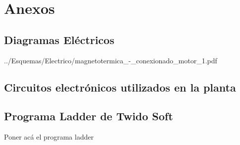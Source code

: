 \chapter{Anexos}
\label{ch:anexos}


\cleardoublepage
\section{Diagramas Eléctricos}
\label{anexo:diag}

{../Esquemas/Electrico/magnetotermica_-_conexionado_motor_1.pdf}




\cleardoublepage
\section{Circuitos electrónicos utilizados en la planta}
\label{anexo:circuitos}




\section{Programa Ladder de Twido Soft}
\label{anexo:programaLadder}
Poner acá el programa ladder
